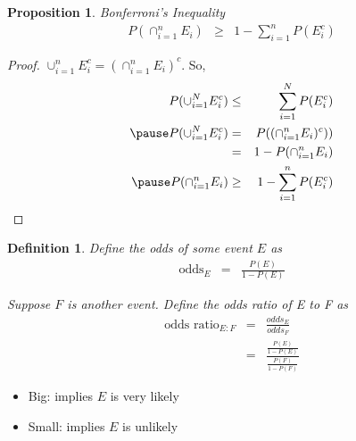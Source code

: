 \documentclass[handout]{beamer}
\newtheorem{prop}{Proposition}
\newtheorem{defn}{Definition}
\numberwithin{equation}{section}
\begin{document}
\begin{frame}

\begin{prop}
Bonferroni's Inequality
\begin{eqnarray}
P(\cap_{i=1}^{n} E_{i} ) & \geq & 1 - \sum_{i=1}^{n} P(E_{i}^{c} ) \nonumber  
\end{eqnarray}

\end{prop}

\pause 
\begin{proof}
$\cup_{i=1}^{n} E_{i}^{c} = (\cap_{i=1}^{n} E_{i})^c$.  So,  \pause 
\begin{eqnarray}
P(\cup_{i=1}^{N} E_{i}^{c} ) & \leq  & \sum_{i=1}^{N} P(E_{i}^{c} ) \nonumber \\ \pause 
P(\cup_{i=1}^{N} E_{i}^{c} ) & = & P((\cap_{i=1}^{n} E_{i})^c)) \nonumber \\
& = & 1 - P(\cap_{i=1}^{n} E_{i}) \nonumber \\ \pause 
P(\cap_{i=1}^{n} E_{i}) & \geq  &  1- \sum_{i=1}^{n} P(E_{i}^{c} )\nonumber 
\end{eqnarray}



\end{proof}


\end{frame}


\begin{frame}

\begin{defn}
Define the odds of some event $E$ as 
\begin{eqnarray}
\text{odds}_{E} & = & \frac{P(E)}{1 - P(E)} \nonumber 
\end{eqnarray}

Suppose $F$ is another event.  Define the \alert{odds ratio} of E to F as
\begin{eqnarray}
\text{odds ratio}_{E:F} & = & \frac{odds_{E}}{odds_{F}} \nonumber \\
& = & \frac{\frac{P(E)}{1-P(E)}}{\frac{P(F)}{1-P(F)}}\nonumber 
\end{eqnarray}


\end{defn}

\begin{itemize}
\item[-] Big: implies $E$ is very likely
\item[-] Small: implies $E$ is unlikely
\end{itemize}



\end{frame}
\end{document}
